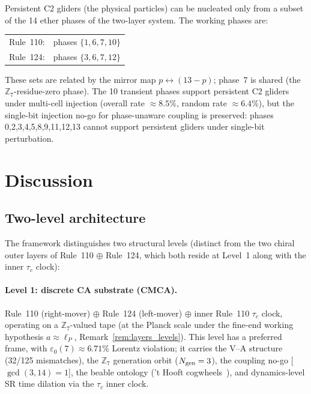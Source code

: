 \documentclass[11pt]{article}
\theoremstyle{remark}
\newcommand{\ZS}{\mathbb{Z}_7}
\newcommand{\Ngen}{N_{\rm gen}}
\newcommand{\epsz}{\varepsilon_0}
\begin{document}
Persistent C2 gliders (the physical particles) can be nucleated only from a
subset of the 14 ether phases of the two-layer system.  The working phases
are:

\begin{center}
\begin{tabular}{ll}
  Rule~110: & phases $\{1,6,7,10\}$ \\
  Rule~124: & phases $\{3,6,7,12\}$ \\
\end{tabular}
\end{center}

These sets are related by the mirror map $p\leftrightarrow(13-p)$; phase~7
is shared (the $\ZS$-residue-zero phase).  The 10 transient phases support
persistent C2 gliders under multi-cell injection (overall rate $\approx8.5\%$,
random rate $\approx6.4\%$), but the single-bit injection no-go for
phase-unaware coupling is preserved: phases 0,2,3,4,5,8,9,11,12,13
cannot support persistent gliders under single-bit perturbation.

\section{Discussion}
\label{sec:discussion}

\subsection{Two-level architecture}
\label{ssec:two_level}

The framework distinguishes two structural levels (distinct from the two chiral
outer layers of Rule~110 $\oplus$ Rule~124, which both reside at Level~1 along
with the inner $\tau_c$ clock):

\paragraph{Level 1: discrete CA substrate (CMCA).}
Rule~110 (right-mover) $\oplus$ Rule~124 (left-mover) $\oplus$ inner Rule~110
$\tau_c$ clock, operating on a $\ZS$-valued tape (at the Planck scale under
the fine-end working hypothesis $a\approx\ell_P$,
Remark~\ref{rem:layers_levels}).  This
level has a preferred frame, with $\epsz(7)\approx6.71\%$ Lorentz violation;
it carries the V--A structure (32/125 mismatches), the $\ZS$ generation orbit
($\Ngen=3$), the coupling no-go [$\gcd(3,14)=1$], the beable ontology
('t Hooft cogwheels~\cite{tHooft2016CA}), and dynamics-level SR time dilation
via the $\tau_c$ inner clock.
\end{document}
